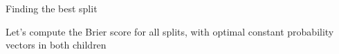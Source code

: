 \documentclass[11pt,compress,t,notes=noshow, xcolor=table]{beamer}
\begin{document}
\begin{frame}[b]{Finding the best split}

Let's compute the Brier score for all splits, with optimal constant probability vectors in both children

\vspace{0.5cm}

\end{frame}
\end{document}
